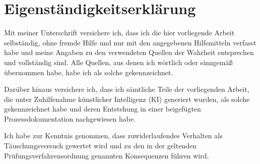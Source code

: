 \section*{Eigenständigkeitserklärung}

Mit meiner Unterschrift versichere ich, dass ich die hier vorliegende Arbeit selbständig, ohne fremde Hilfe und nur mit den angegebenen Hilfsmitteln verfasst habe und meine Angaben zu den verwendeten Quellen der Wahrheit entsprechen und vollständig sind. Alle Quellen, aus denen ich wörtlich oder sinngemäß übernommen habe, habe ich als solche gekennzeichnet.

Darüber hinaus versichere ich, dass ich sämtliche Teile der vorliegenden Arbeit, die unter Zuhilfenahme künstlicher Intelligenz (KI) generiert wurden, als solche gekennzeichnet habe und deren Entstehung in einer beigefügten Prozessdokumentation nachgewiesen habe.

Ich habe zur Kenntnis genommen, dass zuwiderlaufendes Verhalten als Täuschungsversuch gewertet wird und zu den in der geltenden Prüfungsverfahrensordnung genannten Konsequenzen führen wird. 

\vspace{1cm}

